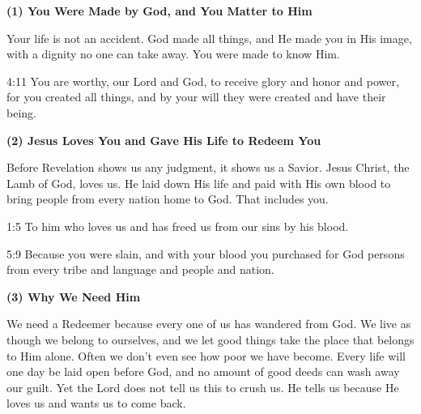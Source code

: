 \clearpage
{}

\begin{center}
\begin{tcolorbox}[
    width=0.95\textwidth,
    colback=white,
    colframe=gray!70,
    colbacktitle=gray,
    coltitle=white,
    title={\small Did you know that Revelation holds the gospel for you?},
    halign title=center,
    fontupper=\small\setstretch{1.0},
    enhanced,
    boxrule=0.5pt,
    breakable,
    left=6pt,
    right=6pt,
    top=6pt,
    bottom=6pt,
    before upper={\toggletrue{InOuterBox}},
]

\textbf{(1) You Were Made by God, and You Matter to Him}

Your life is not an accident. God made all things, and He made you in His image, with a dignity no one can take away. You were made to know Him.

\begin{ScriptureBox}
\item[4:11] You are worthy, our Lord and God, to receive glory and honor and power, for you created all things, and by your will they were created and have their being.
\end{ScriptureBox}

\vspace{0.3cm}

\textbf{(2) Jesus Loves You and Gave His Life to Redeem You}

Before Revelation shows us any judgment, it shows us a Savior. Jesus Christ, the Lamb of God, loves us. He laid down His life and paid with His own blood to bring people from every nation home to God. That includes you.

\begin{ScriptureBox}
\item[1:5] To him who loves us and has freed us from our sins by his blood.
\item[5:9] Because you were slain, and with your blood you purchased for God persons from every tribe and language and people and nation.
\end{ScriptureBox}

\vspace{0.3cm}

\textbf{(3) Why We Need Him}

We need a Redeemer because every one of us has wandered from God. We live as though we belong to ourselves, and we let good things take the place that belongs to Him alone. Often we don't even see how poor we have become. Every life will one day be laid open before God, and no amount of good deeds can wash away our guilt. Yet the Lord does not tell us this to crush us. He tells us because He loves us and wants us to come back.


\end{tcolorbox}
\end{center}
